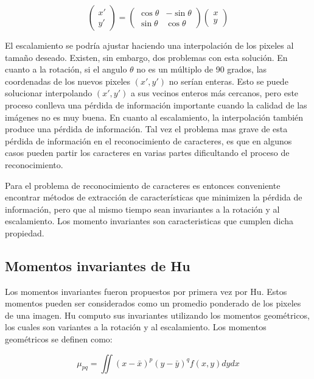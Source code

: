\documentclass[a4paper, 11pt, oneside]{report}
\begin{document}
	\[
		\begin{pmatrix} 
			x' \\ y'
		\end{pmatrix}
		=
		\begin{pmatrix} 
			\cos\theta & -\sin\theta \\
			\sin\theta & \cos\theta
		\end{pmatrix}
		\begin{pmatrix} 
			x \\ y
		\end{pmatrix}
	\]

El escalamiento se podría ajustar haciendo una interpolación de los pixeles al tamaño deseado. Existen, sin embargo, dos problemas con esta solución. En cuanto a la rotación, si el angulo $\theta$ no es un múltiplo de 90 grados, las coordenadas de los nuevos pixeles $(x', y')$ no serían enteras. Esto se puede solucionar interpolando $(x',y')$ a sus vecinos enteros más cercanos, pero este proceso conlleva una pérdida de información importante cuando la calidad de las imágenes no es muy buena. En cuanto al escalamiento, la interpolación también produce una pérdida de información. Tal vez el problema mas grave de esta pérdida de información en el reconocimiento de caracteres, es que en algunos casos pueden partir los caracteres en varias partes dificultando el proceso de reconocimiento.

Para el problema de reconocimiento de caracteres es entonces conveniente encontrar métodos de extracción de características que minimizen la pérdida de información, pero que al mismo tiempo sean invariantes a la rotación y al escalamiento. Los momento invariantes son caracteristicas que cumplen dicha propiedad.

\subsection{Momentos invariantes de Hu}	
\label{sect:invariants}

Los momentos invariantes fueron propuestos por primera vez por Hu\cite{Hu62}. Estos momentos pueden ser considerados como un promedio ponderado de los pixeles de una imagen. Hu computo sus invariantes utilizando los momentos geométricos, los cuales son variantes a la rotación y al escalamiento. Los momentos geométricos se definen como:

	\begin{equation}\label{eq1}
		\mu_{pq} = \iint{ {(x-\bar{x})^p} {(y-\bar{y})^q} f(x,y) dy dx }
	\end{equation}
\end{document}
